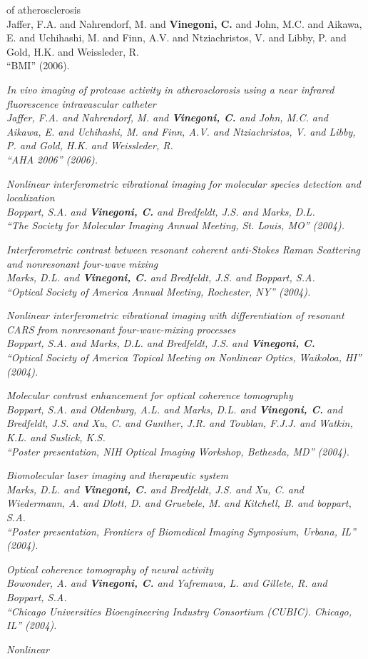 of atherosclerosis \\ Jaffer, F.A. and Nahrendorf, M. and {\bf Vinegoni, C.} and John, M.C. and Aikawa, E. and Uchihashi, M. and Finn, A.V. and Ntziachristos, V. and Libby, P. and Gold, H.K. and Weissleder, R. \\ ``BMI''  (2006). \item \it In vivo imaging of protease activity in atherosclorosis using a near infrared fluorescence intravascular catheter \\ Jaffer, F.A. and Nahrendorf, M. and {\bf Vinegoni, C.} and John, M.C. and Aikawa, E. and Uchihashi, M. and Finn, A.V. and Ntziachristos, V. and Libby, P. and Gold, H.K. and Weissleder, R. \\ ``AHA 2006''  (2006). \item \it Nonlinear interferometric vibrational imaging for molecular species detection and localization \\ Boppart, S.A. and {\bf Vinegoni, C.} and Bredfeldt, J.S. and Marks, D.L. \\ ``The Society for Molecular Imaging Annual Meeting, St. Louis, MO''  (2004). \item \it Interferometric contrast between resonant coherent anti-Stokes Raman Scattering and nonresonant four-wave mixing \\ Marks, D.L. and {\bf Vinegoni, C.} and Bredfeldt, J.S. and Boppart, S.A. \\ ``Optical Society of America Annual Meeting, Rochester, NY''  (2004). \item \it Nonlinear interferometric vibrational imaging with differentiation of resonant CARS from nonresonant four-wave-mixing processes \\ Boppart, S.A. and Marks, D.L. and Bredfeldt, J.S. and {\bf Vinegoni, C.} \\ ``Optical Society of America Topical Meeting on Nonlinear Optics, Waikoloa, HI''  (2004). \item \it Molecular contrast enhancement for optical coherence tomography \\ Boppart, S.A. and Oldenburg, A.L. and Marks, D.L. and {\bf Vinegoni, C.} and Bredfeldt, J.S. and Xu, C. and Gunther, J.R. and Toublan, F.J.J. and Watkin, K.L. and Suslick, K.S. \\ ``Poster presentation, NIH Optical Imaging Workshop, Bethesda, MD''  (2004). \item \it Biomolecular laser imaging and therapeutic system \\ Marks, D.L. and {\bf Vinegoni, C.} and Bredfeldt, J.S. and Xu, C. and Wiedermann, A. and Dlott, D. and Gruebele, M. and Kitchell, B. and boppart, S.A. \\ ``Poster presentation, Frontiers of Biomedical Imaging Symposium, Urbana, IL''  (2004). \item \it Optical coherence tomography of neural activity \\ Bowonder, A. and {\bf Vinegoni, C.} and Yafremava, L. and Gillete, R. and Boppart, S.A. \\ ``Chicago Universities Bioengineering Industry Consortium (CUBIC). Chicago, IL''  (2004). \item \it Nonlinear 